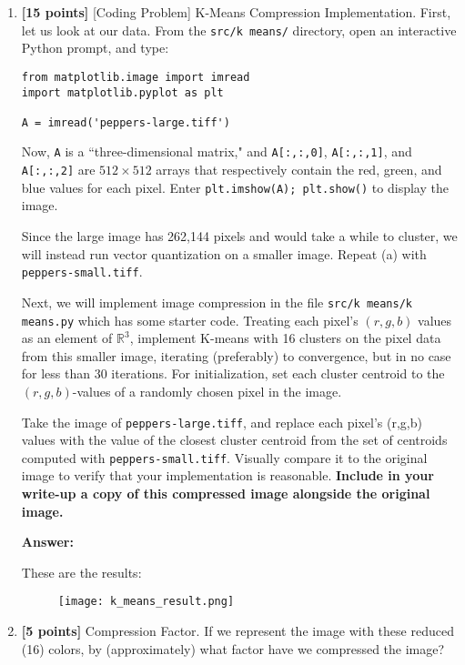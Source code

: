 \documentclass{article}
\begin{document}
\begin{enumerate}[label=\alph*)]
    \item \textbf{[15 points]} [Coding Problem] K-Means Compression Implementation. First, let us look at our data. From the \texttt{src/k means/} directory, open an interactive Python prompt, and type:
\begin{verbatim}
from matplotlib.image import imread
import matplotlib.pyplot as plt

A = imread('peppers-large.tiff')
\end{verbatim}
Now, \texttt{A} is a ``three-dimensional matrix," and \texttt{A[:,:,0]}, \texttt{A[:,:,1]}, and \texttt{A[:,:,2]} are $512 \times 512$ arrays that respectively contain the red, green, and blue values for each pixel. Enter \texttt{plt.imshow(A); plt.show()} to display the image.

Since the large image has 262,144 pixels and would take a while to cluster, we will instead run vector quantization on a smaller image. Repeat (a) with \texttt{peppers-small.tiff}.

Next, we will implement image compression in the file \texttt{src/k means/k means.py} which has some starter code. Treating each pixel’s $(r, g, b)$ values as an element of $\mathbb{R}^3$, implement K-means with 16 clusters on the pixel data from this smaller image, iterating (preferably) to convergence, but in no case for less than 30 iterations. For initialization, set each cluster centroid to the $(r, g, b)$-values of a randomly chosen pixel in the image.

Take the image of \texttt{peppers-large.tiff}, and replace each pixel’s (r,g,b) values with the value of the closest cluster centroid from the set of centroids computed with \texttt{peppers-small.tiff}. Visually compare it to the original image to verify that your implementation is reasonable. \textbf{Include in your write-up a copy of this compressed image alongside the original image.}

\textbf{Answer:}

These are the results:

\begin{figure}[H]
    \centering
    \texttt{[image: k\_means\_result.png]}
    \label{fig:peppers}
\end{figure}


\item \textbf{[5 points]} Compression Factor.
If we represent the image with these reduced (16) colors, by (approximately) what factor have we compressed the image?




\end{enumerate}
\end{document}
